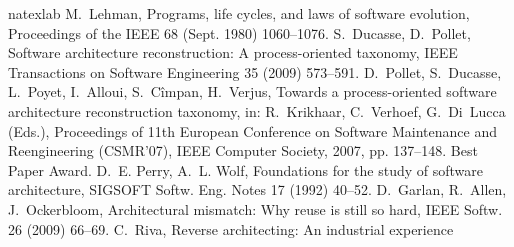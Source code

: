 \documentclass[preprint,12pt]{elsarticle}
\begin{document}

%


\begin{thebibliography}{43}
\expandafter\ifx\csname natexlab\endcsname\relax\def\natexlab#1{#1}\fi
\providecommand{\bibinfo}[2]{#2}
\ifx\xfnm\relax \def\xfnm[#1]{\unskip,\space#1}\fi
\bibinfo{author}{M.~Lehman},
\newblock \bibinfo{title}{Programs, life cycles, and laws of software
  evolution},
\newblock \bibinfo{journal}{Proceedings of the IEEE} \bibinfo{volume}{68}
  (\bibinfo{year}{Sept. 1980}) \bibinfo{pages}{1060--1076}.
\bibinfo{author}{S.~Ducasse}, \bibinfo{author}{D.~Pollet},
\newblock \bibinfo{title}{Software architecture reconstruction: A
  process-oriented taxonomy},
\newblock \bibinfo{journal}{IEEE Transactions on Software Engineering}
  \bibinfo{volume}{35} (\bibinfo{year}{2009}) \bibinfo{pages}{573--591}.
\bibinfo{author}{D.~Pollet}, \bibinfo{author}{S.~Ducasse},
  \bibinfo{author}{L.~Poyet}, \bibinfo{author}{I.~Alloui},
  \bibinfo{author}{S.~C\^impan}, \bibinfo{author}{H.~Verjus},
\newblock \bibinfo{title}{Towards a process-oriented software architecture
  reconstruction taxonomy},
\newblock in: \bibinfo{editor}{R.~Krikhaar}, \bibinfo{editor}{C.~Verhoef},
  \bibinfo{editor}{G.~Di~Lucca} (Eds.), \bibinfo{booktitle}{Proceedings of 11th
  European Conference on Software Maintenance and Reengineering (CSMR'07)},
  \bibinfo{publisher}{IEEE Computer Society}, \bibinfo{year}{2007}, pp.
  \bibinfo{pages}{137--148}. \bibinfo{note}{Best Paper Award}.
\bibinfo{author}{D.~E. Perry}, \bibinfo{author}{A.~L. Wolf},
\newblock \bibinfo{title}{Foundations for the study of software architecture},
\newblock \bibinfo{journal}{SIGSOFT Softw. Eng. Notes} \bibinfo{volume}{17}
  (\bibinfo{year}{1992}) \bibinfo{pages}{40--52}.
\bibinfo{author}{D.~Garlan}, \bibinfo{author}{R.~Allen},
  \bibinfo{author}{J.~Ockerbloom},
\newblock \bibinfo{title}{Architectural mismatch: Why reuse is still so hard},
\newblock \bibinfo{journal}{IEEE Softw.} \bibinfo{volume}{26}
  (\bibinfo{year}{2009}) \bibinfo{pages}{66--69}.
\bibinfo{author}{C.~Riva},
\newblock \bibinfo{title}{Reverse architecting: An industrial experience
}
\end{thebibliography}
\end{document}
